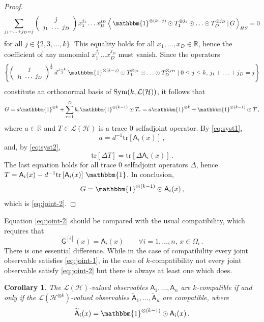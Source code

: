 \documentclass[12pt]{amsart}
\newtheorem{corollary}{Corollary}
\theoremstyle{definition}
\newcommand{\real}{\mathbb R} %
\newcommand{\hh}{\mathcal{H}} %
\newcommand{\lh}{\mathcal{L(H)}} %
\newcommand{\elle}[1]{\mathcal{L}(#1)} %
\newcommand{\ip}[2]{\left\langle\,#1\,|\,#2\,\right\rangle} %
\newcommand{\tr}[1]{\mathrm{tr}\left[#1\right]} %
\newcommand{\id}{\mathbbm{1}} %
\newcommand{\A}{\mathsf{A}}%
\newcommand{\G}{\mathsf{G}}%
\newcommand{\Sym}{{\rm Sym}}
\newcommand{\Bin}[2]{\left(\begin{array}{c} #1 \\ #2 \end{array}\right)}
\begin{document}
\begin{proof}
$$
\sum_{j_1+\ldots+j_D = j} \Bin{j}{j_1 \ \ldots \ j_D} x_1^{j_1}\ldots x_D^{j_D}\ip{\id^{\otimes (k-j)}\odot T_1^{\otimes j_1}\odot\ldots\odot T_D^{\otimes j_D}}{G}_{HS} = 0
$$
for all $j\in\{2,3,\ldots,k\}$. This equality holds for all $x_1,\ldots,x_D\in\real$, hence the coefficient of any monomial $x_1^{j_1}\ldots x_D^{j_D}$ must vanish. Since the operators
$$
\left\{ \Bin{j}{j_1 \ \ldots \ j_D}^{\frac{1}{2}} d^{\frac{j-k}{2}}\, \id^{\otimes (k-j)}\odot T_1^{\otimes j_1}\odot\ldots\odot T_D^{\otimes j_D} \mid 0\leq j \leq k ,\, j_1+\ldots+j_D = j \right\}
$$
constitute an orthonormal basis of $\Sym(k,\lh)$, it follows that
$$
G = a \id^{\otimes k} + \sum_{r=1}^D b_r \id^{\otimes (k-1)}\odot T_r = a \id^{\otimes k} + \id^{\otimes (k-1)}\odot T \,,
$$
where $a\in\real$ and $T\in\lh$ is a trace $0$ selfadjoint operator. By \eqref{eq:syst1},
$$
a = d^{-1} \tr{\A_i(x)} \,,
$$
and, by \eqref{eq:syst2},
$$
\tr{\Delta T} = \tr{\Delta\A_i(x)} \,.
$$
The last equation holds for all trace $0$ selfadjoint operators $\Delta$, hence $T = \A_i(x) - d^{-1}\tr{\A_i(x)} \,\id$. In conclusion,
$$
G = \id^{\otimes (k-1)}\odot \A_i(x) \,,
$$
which is \eqref{eq:joint-2}.
\end{proof}

Equation \eqref{eq:joint-2} should be compared with the usual compatibility, which requires that 
\begin{equation}\label{eq:joint-1}
\G^{[i]}(x) = \A_i(x) \qquad \forall i = 1,\ldots,n , \, x\in\Omega_i \, .
\end{equation}
There is one essential difference. 
While in the case of compatibility every joint observable satisfies \eqref{eq:joint-1}, in the case of $k$-compatibility not every joint observable satisfy \eqref{eq:joint-2} but there is always at least one which does.

\begin{corollary}\label{cor:kcomp}
The $\lh$-valued observables $\A_1,\ldots,\A_n$ are $k$-compatible if and only if the $\elle{\hh^{\otimes k}}$-valued observables $\widetilde{\A}_1,\ldots,\widetilde{\A}_n$ are compatible, where
\begin{equation*}
\widetilde{\A}_i(x) = \id^{\otimes (k-1)}\odot\A_i(x) \, .
\end{equation*}
\end{corollary}
\end{document}
